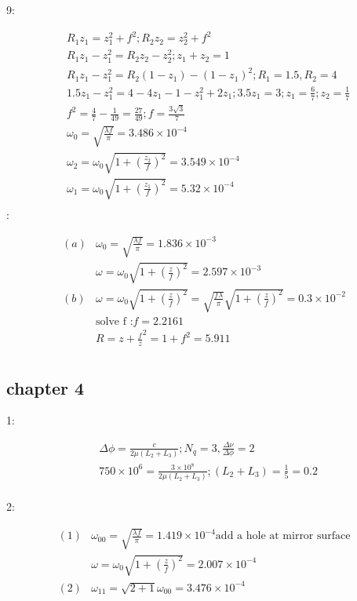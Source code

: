 \documentclass{article}
\begin{document}
9:

\begin{align*}
&R_1z_1=z_1^2+f^2;R_2z_2=z_2^2+f^2\\
&R_1z_1-z_1^2=R_2z_2-z_2^2;z_1+z_2=1\\
&R_1z_1-z_1^2=R_2(1-z_1)-(1-z_1)^2;R_1=1.5,R_2=4\\
&1.5z_1-z_1^2=4-4z_1-1-z_1^2+2z_1;3.5z_1=3;z_1=\frac67;z_2=\frac17\\
&f^2=\frac47-\frac1{49}=\frac{27}{49};f=\frac{3\sqrt{3}}7\\
&\omega_0=\sqrt{\frac{\lambda f}\pi}=3.486 \times 10^{-4}\\
&\omega_2=\omega_0\sqrt{1+(\frac {z_2}f)^2}=3.549 \times 10^{-4}\\
&\omega_1=\omega_0\sqrt{1+(\frac{z_1}f)^2}=5.32 \times 10^{-4}\\
\end{align*}
:

\begin{align*}
  (a)&\omega_0=\sqrt{\frac{\lambda f}\pi}=1.836 \times 10^{-3}\\
     &\omega=\omega_0\sqrt{1+(\frac{z}f)^2}=2.597 \times 10^{-3}\\
  (b)&\omega=\omega_0\sqrt{1+(\frac zf)^2}=\sqrt{\frac{f\lambda}\pi}\sqrt{1+(\frac zf)^2}=0.3 \times 10^{-2}\\
     &\text{solve f :}f=2.2161\\
     &R=z+\frac{f}{z}^2=1+f^2=5.911\\
\end{align*}
\subsection{chapter 4}

1:

\begin{align*}
&\Delta\phi=\frac{c}{2\mu (L_2+L_3)};N_q=3,\frac{\Delta\nu}{\Delta\phi}=2\\
&750 \times 10^{6}=\frac{3 \times 10^8}{2\mu(L_2+L_3)};(L_2+L_3)=\frac15=0.2\\
\end{align*}

2:

\begin{align*}
  (1)&\omega_{00}=\sqrt{\frac{\lambda f}\pi}=1.419 \times 10^{-4}\text{add a hole at mirror surface}\\
     &\omega=\omega_0\sqrt{1+(\frac zf)^2}=2.007 \times 10^{-4}\\
  (2)&\omega_{11}=\sqrt{2+1}\omega_{00}=3.476 \times 10^{-4}\\
\end{align*}
\end{document}
